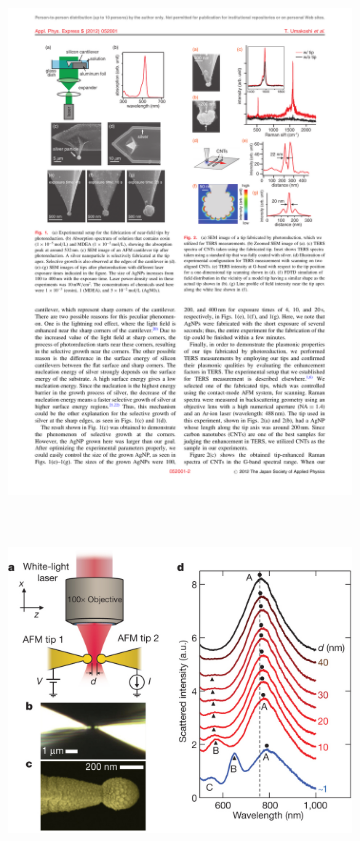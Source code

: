 \documentclass{article}
\begin{document}
\begin{figure}[bt]
\centering
\begin{subfigure}[t]{0.35\textwidth}
	\includegraphics[width=\textwidth, clip=true, trim=0 0 0 130]{figures/literature/umakoshi2012a}
\end{subfigure}
~
\begin{subfigure}[t]{0.6\textwidth}
	\includegraphics[width=\textwidth, clip=true, trim=0 0 0 40]{figures/literature/nature11653-f1-2}

\end{subfigure}
\end{figure}
\end{document}
